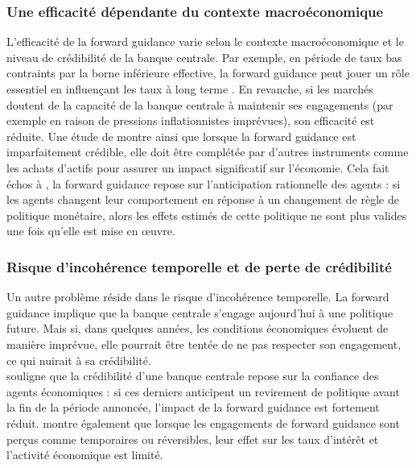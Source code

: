 \subsubsection{Une efficacité dépendante du contexte macroéconomique}

L’efficacité de la forward guidance varie selon le contexte macroéconomique et le niveau de crédibilité de la banque centrale. Par exemple, en période de taux bas contraints par la borne inférieure effective, la forward guidance peut jouer un rôle essentiel en influençant les taux à long terme \citep{eggertsson2003}. En revanche, si les marchés doutent de la capacité de la banque centrale à maintenir ses engagements (par exemple en raison de pressions inflationnistes imprévues), son efficacité est réduite. Une étude de \citep{coenen2021macroeconomic} montre ainsi que lorsque la forward guidance est imparfaitement crédible, elle doit être complétée par d’autres instruments comme les achats d’actifs pour assurer un impact significatif sur l’économie. Cela fait échos à \citep{lucas1976}, la forward guidance repose sur l’anticipation rationnelle des agents : si les agents changent leur comportement en réponse à un changement de règle de politique monétaire, alors les effets estimés de cette politique ne sont plus valides une fois qu'elle est mise en œuvre.

\subsubsection{Risque d’incohérence temporelle et de perte de crédibilité}

Un autre problème réside dans le risque d’incohérence temporelle. La forward guidance implique que la banque centrale s’engage aujourd’hui à une politique future. Mais si, dans quelques années, les conditions économiques évoluent de manière imprévue, elle pourrait être tentée de ne pas respecter son engagement, ce qui nuirait à sa crédibilité.\\

\citep{blinder2000} souligne que la crédibilité d’une banque centrale repose sur la confiance des agents économiques : si ces derniers anticipent un revirement de politique avant la fin de la période annoncée, l’impact de la forward guidance est fortement réduit. \citep{kiley2018} montre également que lorsque les engagements de forward guidance sont perçus comme temporaires ou réversibles, leur effet sur les taux d’intérêt et l’activité économique est limité.\\

